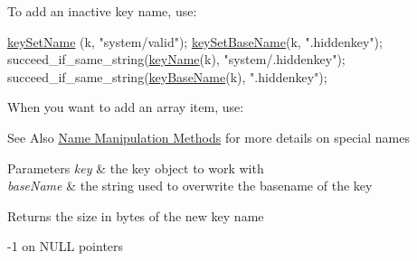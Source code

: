 To add an inactive key name, use\-: 
\begin{DoxyCodeInclude}
        \hyperlink{group__keyname_ga7699091610e7f3f43d2949514a4b35d9}{keySetName} (k, \textcolor{stringliteral}{"system/valid"});
        \hyperlink{group__keyname_ga6e804bd453f98c28b0ff51430d1df407}{keySetBaseName}(k, \textcolor{stringliteral}{".hiddenkey"});
        succeed\_if\_same\_string(\hyperlink{group__keyname_ga8e805c726a60da921d3736cda7813513}{keyName}(k), \textcolor{stringliteral}{"system/.hiddenkey"});
        succeed\_if\_same\_string(\hyperlink{group__keyname_gaaff35e7ca8af5560c47e662ceb9465f5}{keyBaseName}(k), \textcolor{stringliteral}{".hiddenkey"});
\end{DoxyCodeInclude}
 When you want to add an array item, use\-: 
 \begin{DoxySeeAlso}{See Also}
\hyperlink{group__keyname}{Name Manipulation Methods} for more details on special names
\end{DoxySeeAlso}

\begin{DoxyParams}{Parameters}
{\em key} & the key object to work with \\
\hline
{\em base\-Name} & the string used to overwrite the basename of the key \\
\hline
\end{DoxyParams}
\begin{DoxyReturn}{Returns}
the size in bytes of the new key name 

-\/1 on N\-U\-L\-L pointers 
\end{DoxyReturn}


